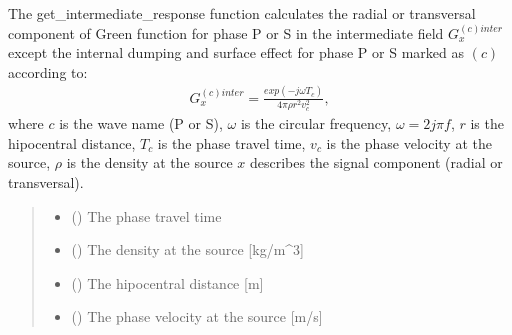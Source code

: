 \documentclass[letterpaper,10pt,english]{sphinxmanual}
\begin{document}
\begin{fulllineitems}
\label{\detokenize{api_support:amw.mw.parameters.get_intermediate_response}}
\pysigstartsignatures
{}
\pysigstopsignatures
\sphinxAtStartPar
The get\_intermediate\_response function calculates the radial or transversal component of Green function
for phase P or S in the intermediate field \(G_x^{\left(c\right)inter}\)
except the internal dumping and surface effect for phase P or S marked as \(\left(c\right)\) according to:
\begin{equation*}
\begin{split}G_x^{\left(c\right)inter}=\frac{exp\left(-j\omega T_c\right)}{4\pi\rho r^2 v_c^2},\end{split}
\end{equation*}
\sphinxAtStartPar
where
\(c\) is the wave name (P or S),
\(\omega\) is the circular frequency, \(\omega = 2j\pi f\),
\(r\) is the hipocentral distance,
\(T_c\) is the phase travel time,
\(v_c\) is the phase velocity at the source,
\(\rho\) is the density at the source
\(x\) describes the signal component (radial or transversal).
\begin{quote}\begin{description}
\begin{itemize}
\item {} 
\sphinxAtStartPar
{} () \textendash{} The phase travel time

\item {} 
\sphinxAtStartPar
{} () \textendash{} The density at the source {[}kg/m\textasciicircum{}3{]}

\item {} 
\sphinxAtStartPar
{} () \textendash{} The hipocentral distance {[}m{]}

\item {} 
\sphinxAtStartPar
{} () \textendash{} The phase velocity at the source {[}m/s{]}


\end{itemize}
\end{description}
\end{quote}
\end{fulllineitems}
\end{document}
